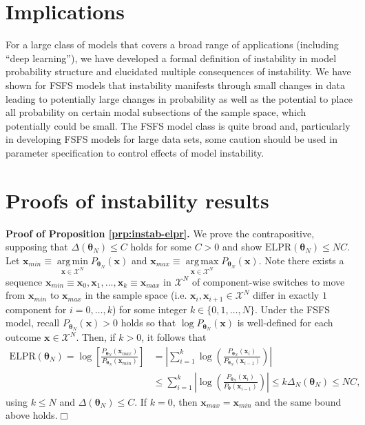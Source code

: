 \documentclass[12pt]{article}
\theoremstyle{definition}
\DeclareMathOperator*{\argmin}{arg\,min}
\DeclareMathOperator*{\argmax}{arg\,max}
\begin{document}
\section{Implications}\label{implications}

For a large class of models that covers a broad range of applications
(including ``deep learning''), we have developed a formal definition of
instability in model probability structure and elucidated multiple
consequences of instability. We have shown for FSFS models that
instability manifests through small changes in data leading to
potentially large changes in probability as well as the potential to
place all probability on certain modal subsections of the sample space,
which potentially could be small. The FSFS model class is quite broad
and, particularly in developing FSFS models for large data sets, some
caution should be used in parameter specification to control effects of
model instability.

\clearpage

\appendix


\section{Proofs of instability results}\label{appendix-instab}

\textbf{Proof of Proposition \ref{prp:instab-elpr}.} We prove the
contrapositive, supposing that \(\Delta(\boldsymbol \theta_N) \le C\)
holds for some \(C > 0\) and show
\(\text{ELPR}(\boldsymbol \theta_N) \leq NC\). Let
\(\boldsymbol x_{min} \equiv \argmin\limits_{\boldsymbol x \in \mathcal{X}^N}P_{\boldsymbol \theta_N}(\boldsymbol x)\)
and
\(\boldsymbol x_{max} \equiv \argmax\limits_{\boldsymbol x \in \mathcal{X}^N}P_{\boldsymbol \theta_N}(\boldsymbol x)\).
Note there exists a sequence
\(\boldsymbol x_{min} \equiv \boldsymbol x_0, \boldsymbol x_1, \dots, \boldsymbol x_k \equiv \boldsymbol x_{max}\)
in \(\mathcal{X}^N\) of component-wise switches to move from
\(\boldsymbol x_{min}\) to \(\boldsymbol x_{max}\) in the sample space
(i.e. \(\boldsymbol x_i, \boldsymbol x_{i + 1} \in \mathcal{X}^N\)
differ in exactly \(1\) component for \(i = 0, \dots, k\)) for some
integer \(k \in \{0, 1, \dots, N\}\). Under the FSFS model, recall
\(P_{\boldsymbol \theta_N}(\boldsymbol x) > 0\) holds so that
\(\log P_{\boldsymbol \theta_N}(\boldsymbol x)\) is well-defined for
each outcome \(\boldsymbol x \in \mathcal{X}^N\). Then, if \(k > 0\), it
follows that
\begin{align*}
\text{ELPR}(\boldsymbol \theta_N) = \log\left[\frac{P_{\boldsymbol \theta_N}(\boldsymbol x_{max})}{P_{\boldsymbol \theta_N}(\boldsymbol x_{min})}\right] &= \left|\sum\limits_{i = 1}^k\log\left(\frac{P_{\boldsymbol \theta_N}(\boldsymbol x_i)}{P_{\boldsymbol \theta_N}(\boldsymbol x_{i-1})}\right)\right| \\
&\le \sum\limits_{i = 1}^k\left|\log\left(\frac{P_{\boldsymbol \theta_N}(\boldsymbol x_i)}{P_{\boldsymbol \theta}(\boldsymbol x_{i-1})}\right)\right| \le k \Delta_N(\boldsymbol \theta_N) \le NC,
\end{align*}
using \(k \le N\) and \(\Delta(\boldsymbol \theta_N) \le C\). If
\(k = 0\), then \(\boldsymbol x_{max} = \boldsymbol x_{min}\) and the
same bound above holds.\hfill \(\Box\)
\end{document}
